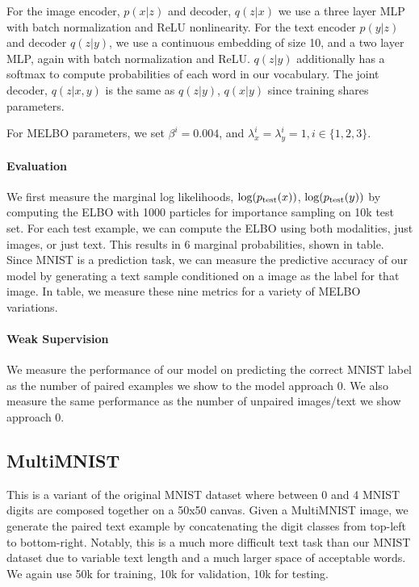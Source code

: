 \documentclass{article}
\begin{document}
For the image encoder, $p(x|z)$ and decoder, $q(z|x)$ we use a three layer MLP with batch normalization and ReLU nonlinearity. For the text encoder $p(y|z)$ and decoder $q(z|y)$, we use a continuous embedding of size 10, and a two layer MLP, again with batch normalization and ReLU. $q(z|y)$ additionally has a softmax to compute probabilities of each word in our vocabulary. The joint decoder, $q(z|x,y)$ is the same as $q(z|y)$, $q(x|y)$ since training shares parameters.

For MELBO parameters, we set $\beta^{i} = 0.004$, and $\lambda_{x}^{i} = \lambda_{y}^{i} = 1, i \in \{1,2,3\}$.

\paragraph{Evaluation} We first measure the marginal log likelihoods, $\textup{log}(p_{\textup{test}}(x))$, $\textup{log}(p_{\textup{test}}(y))$ by computing the ELBO with 1000 particles for importance sampling on 10k test set. For each test example, we can compute the ELBO using both modalities, just images, or just text. This results in 6 marginal probabilities, shown in table. Since MNIST is a prediction task, we can measure the predictive accuracy of our model by generating a text sample conditioned on a image as the label for that image. In table, we measure these nine metrics for a variety of MELBO variations. 

\paragraph{Weak Supervision} We measure the performance of our model on predicting the correct MNIST label as the number of paired examples we show to the model approach 0. We also measure the same performance as the number of unpaired images/text we show approach 0. 

\subsection{MultiMNIST}

This is a variant of the original MNIST dataset where between 0 and 4 MNIST digits are composed together on a 50x50 canvas. Given a MultiMNIST image, we generate the paired text example by concatenating the digit classes from top-left to bottom-right. Notably, this is a much more difficult text task than our MNIST dataset due to variable text length and a much larger space of acceptable words. We again use 50k for training, 10k for validation, 10k for testing.
\end{document}
